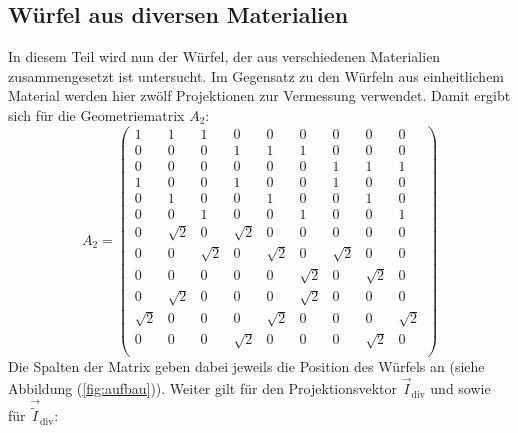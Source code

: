 \subsection{Würfel aus diversen Materialien}
\noindent In diesem Teil wird nun der Würfel, der aus verschiedenen Materialien zusammengesetzt ist untersucht. Im Gegensatz zu den Würfeln aus einheitlichem Material werden hier zwölf Projektionen
zur Vermessung verwendet. Damit ergibt sich für die Geometriematrix $A_\mathrm{2}$:
\begin{equation}
  \label{eqn:geomat}
	A_\mathrm{2}=
	\begin{pmatrix}
    1 & 1 & 1 & 0 & 0 & 0 & 0 & 0 & 0 \\
    0 & 0 & 0 & 1 & 1 & 1 & 0 & 0 & 0 \\
    0 & 0 & 0 & 0 & 0 & 0 & 1 & 1 & 1 \\
    1 & 0 & 0 & 1 & 0 & 0 & 1 & 0 & 0 \\
    0 & 1 & 0 & 0 & 1 & 0 & 0 & 1 & 0 \\
    0 & 0 & 1 & 0 & 0 & 1 & 0 & 0 & 1 \\
    0 & \sqrt{2} & 0 & \sqrt{2} & 0 & 0 & 0 & 0 & 0 \\
    0 & 0 & \sqrt{2} & 0 & \sqrt{2} & 0 & \sqrt{2} & 0 & 0 \\
    0 & 0 & 0 & 0 & 0 & \sqrt{2} & 0 & \sqrt{2} & 0 \\
    0 & \sqrt{2} & 0 & 0 & 0 & \sqrt{2} & 0 & 0 & 0 \\
    \sqrt{2} & 0 & 0 & 0 & \sqrt{2} & 0 & 0 & 0 & \sqrt{2} \\
    0 & 0 & 0 & \sqrt{2} & 0 & 0 & 0 & \sqrt{2} & 0 \\
	\end{pmatrix}
\end{equation}
\FloatBarrier
\noindent Die Spalten der Matrix geben dabei jeweils die Position des Würfels an (siehe Abbildung (\ref{fig:aufbau})).
Weiter gilt für den Projektionsvektor $\vec{I}_\mathrm{div}$ und sowie für $\vec{\tilde{I}}_\mathrm{div}$:
